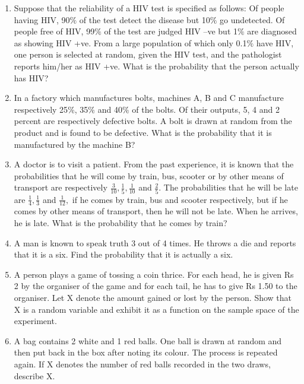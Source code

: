 \begin{enumerate}[label=\arabic*.,ref=\thesubsection.\theenumi]
\item Suppose that the reliability of a HIV test is specified as follows: Of people having HIV, 90$\%$ of the test detect the disease but 10$\%$ go undetected. Of people free of HIV, 99$\%$ of the test are judged HIV –ve but 1$\%$ are diagnosed as showing HIV +ve. From a large population of which only 0.1$\%$ have HIV, one person is selected at random, given the HIV test, and the pathologist reports him/her as HIV +ve. What is the probability that the person actually has HIV?\\

\item In a factory which manufactures bolts, machines A, B and C manufacture respectively 25$\%$, 35$\%$ and 40$\%$ of the bolts. Of their outputs, 5, 4 and 2 percent are respectively defective bolts. A bolt is drawn at random from the product and is found to be defective. What is the probability that it is manufactured by the machine B?\\

\item A doctor is to visit a patient. From the past experience, it is known that the probabilities that he will come by train, bus, scooter or by other means of transport are respectively $\frac{3}{10},\frac{1}{5},\frac{1}{10}$ and $\frac{2}{5}.$ The probabilities that he will be late are $\frac{1}{4},\frac{1}{3}$ and $\frac{1}{12},$ if he comes by train, bus and scooter respectively, but if he comes by other means of transport, then he will not be late. When he arrives, he is late. What is the probability that he comes by train?\\

\item A man is known to speak truth 3 out of 4 times. He throws a die and reports that it is a six. Find the probability that it is actually a six.\\

\item A person plays a game of tossing a coin thrice. For each head, he is given Rs 2 by the organiser of the game and for each tail, he has to give Rs 1.50 to the organiser. Let X denote the amount gained or lost by the person. Show that X is a random variable and exhibit it as a function on the sample space of the experiment.\\

\item A bag contains 2 white and 1 red balls. One ball is drawn at random and then put back in the box after noting its colour. The process is repeated again. If X denotes the number of red balls recorded in the two draws, describe X.\\


\end{enumerate}
